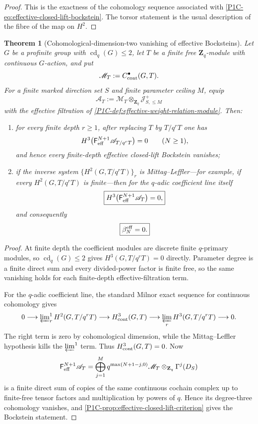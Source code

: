\documentclass[11pt]{article}
\newtheorem{theorem}{Theorem}[section]
\theoremstyle{remark}
\newcommand{\Z}{\mathbf Z}
\begin{document}
\begin{proof}
This is the exactness of the cohomology sequence associated with
\eqref{P1C-eq:effective-closed-lift-bockstein}.  The torsor statement is the usual description of the
fibre of the map on $H^2$.
\end{proof}


\begin{theorem}[Cohomological-dimension-two vanishing of effective Bocksteins]
\label{P1C-thm:cd2-effective-bockstein-vanishing}
Let $G$ be a profinite group with $\operatorname{cd}_q(G)\le2$, let $T$ be a finite free
$\Z_q$-module with continuous $G$-action, and put
\[
 \mathscr M_T:=C^\bullet_{\rm cont}(G,T).
\]
For a finite marked direction set $S$ and finite parameter ceiling $M$, equip
\[
 \mathscr A_T:=\mathscr M_T\otimes_{\Z_q}\mathscr J^+_{S,\le M}
\]
with the effective filtration of \cref{P1C-def:effective-weight-relation-module}.  Then:
\begin{enumerate}[label=\textup{(\roman*)}]
\item for every finite depth $r\ge1$, after replacing $T$ by $T/q^rT$ one has
\[
 H^3\!\left(\mathsf F_{\rm eff}^{N+1}\mathscr A_{T/q^rT}\right)=0
 \qquad(N\ge1),
\]
and hence every finite-depth effective closed-lift Bockstein vanishes;
\item if the inverse system $\{H^2(G,T/q^rT)\}_r$ is Mittag--Leffler---for example, if every
$H^2(G,T/q^rT)$ is finite---then for the $q$-adic coefficient line itself
\begin{equation}\label{P1C-eq:cd2-effective-h3-vanishing}
 \boxed{
 H^3\!\left(\mathsf F_{\rm eff}^{N+1}\mathscr A_T\right)=0,}
\end{equation}
and consequently
\begin{equation}\label{P1C-eq:cd2-effective-beta-zero}
 \boxed{\beta_N^{\rm eff}=0.}
\end{equation}
\end{enumerate}
\end{theorem}

\begin{proof}
At finite depth the coefficient modules are discrete finite $q$-primary modules, so
$\operatorname{cd}_q(G)\le2$ gives $H^3(G,T/q^rT)=0$ directly.  Parameter degree is a finite
direct sum and every divided-power factor is finite free, so the same vanishing holds for each
finite-depth effective-filtration term.

For the $q$-adic coefficient line, the standard Milnor exact sequence for continuous cohomology gives
\[
 0\longrightarrow
 \varprojlim\nolimits_r^{1}H^2(G,T/q^rT)
 \longrightarrow H^3_{\rm cont}(G,T)
 \longrightarrow
 \varprojlim_r H^3(G,T/q^rT)
 \longrightarrow0.
\]
The right term is zero by cohomological dimension, while the Mittag--Leffler hypothesis kills the
$\varprojlim^1$ term.  Thus $H^3_{\rm cont}(G,T)=0$.  Now
\[
 \mathsf F_{\rm eff}^{N+1}\mathscr A_T
 =\bigoplus_{j=1}^{M}
 q^{\max(N+1-j,0)}\mathscr M_T\otimes_{\Z_q}\Gamma^j(D_S)
\]
is a finite direct sum of copies of the same continuous cochain complex up to finite-free tensor
factors and multiplication by powers of $q$.  Hence its degree-three cohomology vanishes, and
\cref{P1C-prop:effective-closed-lift-criterion} gives the Bockstein statement.
\end{proof}
\end{document}
